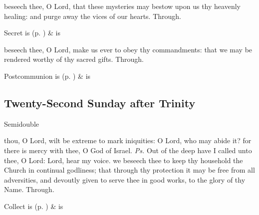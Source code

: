 
\vspace{-0.25\baselineskip}

\secret
{} beseech thee, O Lord, that these mysteries may bestow upon us thy heavenly healing: and purge away the vices of our hearts. Through.


\begin{rubric}
     Secret is  (p. \pageref{SPSaints}) \&  is 
\end{rubric}


\vspace{-0.25\baselineskip}

\postcommunion
{} beseech thee, O Lord, make us ever to obey thy commandments: that we may be rendered worthy of thy sacred gifts. Through.


\begin{rubric}
     Postcommunion is  (p. \pageref{SPSaints}) \&  is 
\end{rubric}


\clearpage
\subsection{Twenty-Second Sunday after Trinity}
\begin{inhead}
{Semidouble}
\end{inhead}


\introit
{} thou, O Lord, wilt be extreme to mark iniquities: O Lord, who may abide it? for there is mercy with thee, O God of Israel. \textit{Ps.} Out of the deep have I called unto thee, O Lord: Lord, hear my voice.
\collect
{} we beseech thee to keep thy household the Church in continual godliness; that through thy protection it may be free from all adversities, and devoutly given to serve thee in good works, to the glory of thy Name. Through.
\begin{rubric}
     Collect is  (p. \pageref{SPSaints}) \&  is 
\end{rubric}

